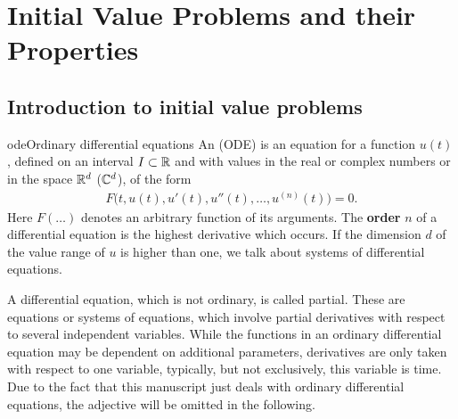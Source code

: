 \chapter{Initial Value Problems and their Properties}
\label{cha:awa}

\section{Introduction to initial value problems}


\begin{Definition*}{ode}{Ordinary differential equations}
    An  (ODE) is an equation for a function $u(t)$, defined on
  an interval $I \subset \mathbb R$ and with values in the real or complex
  numbers or in the space $\mathbb R^d$ ($\mathbb C^d$), of the form
  \begin{gather}
    F\bigl(t, u(t), u'(t), u''(t), \dots, u^{(n)}(t)\bigr) = 0.
  \end{gather}
  Here $F(\ldots)$ denotes an arbitrary function of its arguments.
  The \textbf{order} $n$ of
  a differential equation is the highest derivative which occurs.  If
  the dimension $d$ of the value range of $u$ is higher than one, we
  talk about systems of differential equations.
\end{Definition*}

\begin{remark}
  A differential equation, which is not ordinary, is called partial.
  These are equations or systems of equations, which involve partial
  derivatives with respect to several independent variables.  While
  the functions in an ordinary differential equation may be dependent
  on additional parameters, derivatives are only taken with respect to
  one variable, typically, but not exclusively, this variable is
  time. Due to the fact that this manuscript just deals with ordinary
  differential equations, the adjective will be omitted in the
  following.
\end{remark}




